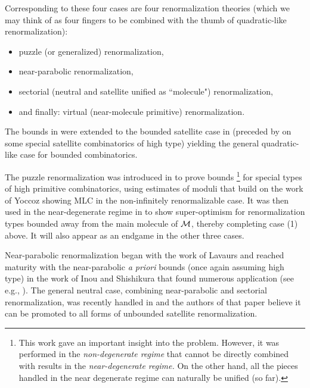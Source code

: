 \documentclass[12pt]{amsart}
\begin{document}


Corresponding to these four cases are four renormalization theories 
(which we may think of as four fingers to be combined with the thumb of quadratic-like renormalization):
\begin{itemize}
\item
puzzle (or generalized) renormalization, 
\item
near-parabolic {renormalization}, 
\item
sectorial (neutral and satellite {unified as ``molecule"}) renormalization, 
\item
and finally:  virtual (near-molecule primitive) renormalization. 
\end{itemize}
The bounds in \cite{K06} were extended to the bounded satellite case in \cite{dudko2023mlcfeigenbaumpoints}
(preceded by \cite{DL_pacmen} on some special satellite combinatorics of  high type)
yielding the  general quadratic-like case for bounded combinatorics.

The puzzle renormalization 
was introduced in \cite{lyubich1997dynamics} to prove bounds%
\footnote{\label{incompatibility} {This work gave an important insight into the problem.}
  However, it was performed in the {\em non-degenerate regime} 
that cannot be directly combined with results in the {\em near-degenerate regime.} 
{On the other hand, all the pieces handled in the near degenerate regime
can naturally be unified (so far).}}
for special types of high primitive  combinatorics,
using estimates of moduli 
that build on the work of Yoccoz showing MLC in the non-infinitely renormalizable case. 
It was then used {in} the near-degenerate regime in \cite{KL:decorations,KL:molecules} to show super-optimism for renormalization types bounded away from the main molecule of $\mathcal M$,
thereby completing case (1) above. 
It will also appear as an endgame in the other three cases. 



Near-parabolic renormalization began with the work of Lavaurs and reached maturity with the 
near-parabolic {\em a priori} bounds (once again assuming high type)
in the work of Inou and Shishikura \cite{IS}
{that found numerous application (see e.g., \cite{BC12,AL22,CS_satellite}).}
The general neutral case,
combining near-parabolic and sectorial renormalization,
was recently handled in \cite{DLneutral} 
and the authors of that paper believe it can be promoted to all forms of unbounded satellite renormalization.
\end{document}
